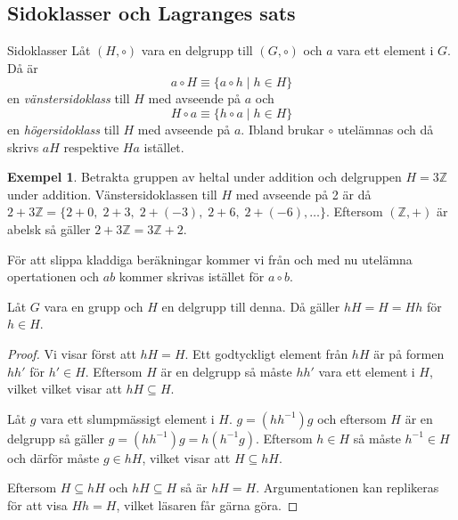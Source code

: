 \documentclass{article}
\theoremstyle{definition}
\newtheorem{exmp}[thm]{Exempel}
\begin{document}
\subsection{Sidoklasser och Lagranges sats}
\begin{mydef}{}{Sidoklasser}
  Låt $(H, \circ)$ vara en delgrupp till $(G, \circ)$ och $a$ vara ett element i $G$. 
  Då är
  \[a \circ H \equiv \{a \circ h \; | \; h \in H\}\]
  en \textit{vänstersidoklass} till $H$ med avseende på $a$ och 
  \[H \circ a \equiv \{h \circ a \; | \; h \in H\}\]
  en \textit{högersidoklass} till $H$ med avseende på $a$. Ibland brukar $\circ$ utelämnas 
  och då skrivs $aH$ respektive $Ha$ istället.
\end{mydef}
\begin{exmp}
  Betrakta gruppen av heltal under addition och delgruppen $H = 3 \mathbb{Z}$ under addition. 
  Vänstersidoklassen till $H$ med avseende på 2 är då 
  $2 + 3 \mathbb{Z} = \{ 2+0, \;2+3, \;2+(-3), \;2+6, \;2+(-6), \ldots\}$.
  Eftersom $(\mathbb{Z}, +)$ är abelsk så gäller $2 + 3 \mathbb{Z} = 3 \mathbb{Z} + 2$. 
\end{exmp}

För att slippa kladdiga beräkningar kommer vi från och med nu utelämna opertationen och $ab$ kommer
skrivas istället för $a \circ b$.

\hypertarget{lemma4.1}{}
\begin{mylemma}{}{}
  Låt $G$ vara en grupp och $H$ en delgrupp till denna. Då gäller $hH = H = Hh$ 
  för $h \in H$.
\end{mylemma}
\begin{proof}
  Vi visar först att $hH = H$. 
  Ett godtyckligt element från $hH$ är på formen $hh'$ för $h' \in H$. Eftersom $H$ är 
  en delgrupp så måste $hh'$ vara ett element i $H$, vilket vilket visar att $hH \subseteq H$.

  Låt $g$ vara ett slumpmässigt element i $H$. $g = (hh^{-1})g$ och eftersom 
  $H$ är en delgrupp så gäller $g = (hh^{-1})g = h(h^{-1}g)$. Eftersom $h \in H$ så måste 
  $h^{-1} \in H$ och därför måste $g \in hH$, vilket visar att $H \subseteq hH$.

  Eftersom $H \subseteq hH$ och $hH \subseteq H$ så är $hH = H$. Argumentationen kan 
  replikeras för att visa $Hh = H$, vilket läsaren får gärna göra. 
\end{proof}
\end{document}
